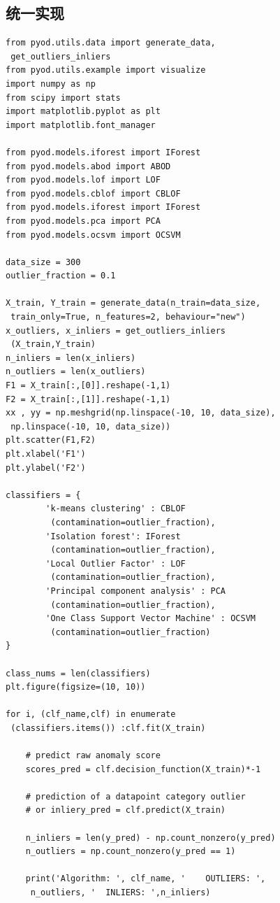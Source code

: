 \documentclass[UTF8]{ctexart}
\begin{document}
    \subsection{统一实现}
\begin{lstlisting}[style=stylePy]
from pyod.utils.data import generate_data, 
 get_outliers_inliers
from pyod.utils.example import visualize
import numpy as np
from scipy import stats
import matplotlib.pyplot as plt
import matplotlib.font_manager

from pyod.models.iforest import IForest  
from pyod.models.abod import ABOD
from pyod.models.lof import LOF
from pyod.models.cblof import CBLOF
from pyod.models.iforest import IForest 
from pyod.models.pca import PCA 
from pyod.models.ocsvm import OCSVM

data_size = 300
outlier_fraction = 0.1

X_train, Y_train = generate_data(n_train=data_size, 
 train_only=True, n_features=2, behaviour="new")
x_outliers, x_inliers = get_outliers_inliers
 (X_train,Y_train)
n_inliers = len(x_inliers)
n_outliers = len(x_outliers)
F1 = X_train[:,[0]].reshape(-1,1)
F2 = X_train[:,[1]].reshape(-1,1)
xx , yy = np.meshgrid(np.linspace(-10, 10, data_size), 
 np.linspace(-10, 10, data_size))
plt.scatter(F1,F2)
plt.xlabel('F1')
plt.ylabel('F2') 

classifiers = {
        'k-means clustering' : CBLOF
         (contamination=outlier_fraction),
        'Isolation forest': IForest
         (contamination=outlier_fraction),
        'Local Outlier Factor' : LOF
         (contamination=outlier_fraction),
        'Principal component analysis' : PCA
         (contamination=outlier_fraction),
        'One Class Support Vector Machine' : OCSVM
         (contamination=outlier_fraction)
}

class_nums = len(classifiers)
plt.figure(figsize=(10, 10))

for i, (clf_name,clf) in enumerate
 (classifiers.items()) :clf.fit(X_train)

    # predict raw anomaly score
    scores_pred = clf.decision_function(X_train)*-1

    # prediction of a datapoint category outlier
    # or inliery_pred = clf.predict(X_train)

    n_inliers = len(y_pred) - np.count_nonzero(y_pred)
    n_outliers = np.count_nonzero(y_pred == 1)

    print('Algorithm: ', clf_name, '    OUTLIERS: ',
     n_outliers, '  INLIERS: ',n_inliers)


\end{lstlisting}
\end{document}

